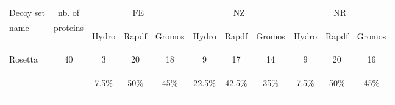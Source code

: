 \documentclass[a4paper,20pt,notitlepage,openbib]{article}
\begin{document}
\begin{table}[htbp]
\begin{center}
\begin{tabular}{| l | c | c c c | c c c | c c c |}
\hline
Decoy set & nb. of    & \multicolumn{3}{|c|}{FE} & \multicolumn{3}{|c|}{NZ} & \multicolumn{3}{|c|}{NR}\\
name      & proteins  & \begin{tiny}Hydro\end{tiny} & \begin{tiny}Rapdf\end{tiny} & \begin{tiny}Gromos\end{tiny} & \begin{tiny}Hydro\end{tiny} & \begin{tiny}Rapdf\end{tiny} & \begin{tiny}Gromos\end{tiny} & \begin{tiny}Hydro\end{tiny} & \begin{tiny}Rapdf\end{tiny} & \begin{tiny}Gromos \end{tiny} \\
\hline
Rosetta &  40 & 3 & 20 & 18                             & 9 & 17 & 14                                & 9 & 20 & 16                             \\
        &     & \begin{small}7.5\%\end{small} & \begin{small}50\%\end{small} & \begin{small}45\%\end{small} & \begin{small}22.5\%\end{small} & \begin{small}42.5\%\end{small} & \begin{small}35\%\end{small} & \begin{small}7.5\%\end{small} & \begin{small}50\%\end{small} & \begin{small}45\%\end{small} \\

\end{tabular}
\end{center}
\end{table}
\end{document}
